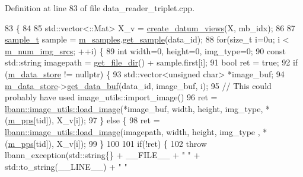Definition at line 83 of file data\+\_\+reader\+\_\+triplet.\+cpp.


\begin{DoxyCode}
83                                                                               \{
84 
85   std::vector<::Mat> X\_v = \hyperlink{classlbann_1_1data__reader__multi__images_a713e4cc80a2d3a2b721d0912e3773baa}{create\_datum\_views}(X, mb\_idx);
86 
87   \hyperlink{classlbann_1_1data__reader__triplet_adddc55e0424d38b60ac5f55c16990bb7}{sample\_t} sample = \hyperlink{classlbann_1_1data__reader__triplet_a1f414c6d80f6e48fc91f98db0531f1f8}{m\_samples}.\hyperlink{classlbann_1_1offline__patches__npz_a9c8ad05ffdf0d44ee1c9b61740dd42e3}{get\_sample}(data\_id);
88   \textcolor{keywordflow}{for}(\textcolor{keywordtype}{size\_t} i=0u; i < \hyperlink{classlbann_1_1data__reader__multi__images_a70752a5442e99333fec52def9eadc58f}{m\_num\_img\_srcs}; ++i) \{
89     \textcolor{keywordtype}{int} width=0, height=0, img\_type=0;
90     \textcolor{keyword}{const} std::string imagepath = \hyperlink{classlbann_1_1generic__data__reader_ab4c6c2d4ba40ece809ce896828c8ff03}{get\_file\_dir}() + sample.first[i];
91     \textcolor{keywordtype}{bool} ret = \textcolor{keyword}{true};
92     \textcolor{keywordflow}{if} (\hyperlink{classlbann_1_1generic__data__reader_aefc076b842933a882214f4f709ca49c9}{m\_data\_store} != \textcolor{keyword}{nullptr}) \{
93       std::vector<unsigned char> *image\_buf;
94       \hyperlink{classlbann_1_1generic__data__reader_aefc076b842933a882214f4f709ca49c9}{m\_data\_store}->\hyperlink{classlbann_1_1generic__data__store_a2abb3d0327b528d36e23fcef9b937798}{get\_data\_buf}(data\_id, image\_buf, i);
95       \textcolor{comment}{// This could probably have used image\_utils::import\_image()}
96       ret = \hyperlink{classlbann_1_1image__utils_ac324a04f877601387cfb10750f1f6b8d}{lbann::image\_utils::load\_image}(*image\_buf, width, height, 
      img\_type, *(\hyperlink{classlbann_1_1imagenet__reader_a1e0d0ed4ac529de3e9f735512f5e3dd8}{m\_pps}[tid]), X\_v[i]);
97     \} \textcolor{keywordflow}{else} \{
98       ret = \hyperlink{classlbann_1_1image__utils_ac324a04f877601387cfb10750f1f6b8d}{lbann::image\_utils::load\_image}(imagepath, width, height, img\_type
      , *(\hyperlink{classlbann_1_1imagenet__reader_a1e0d0ed4ac529de3e9f735512f5e3dd8}{m\_pps}[tid]), X\_v[i]);
99     \}
100   
101     \textcolor{keywordflow}{if}(!ret) \{
102       \textcolor{keywordflow}{throw} lbann\_exception(std::string\{\} + \_\_FILE\_\_ + \textcolor{stringliteral}{" "} + std::to\_string(\_\_LINE\_\_) + \textcolor{stringliteral}{" "}

\end{DoxyCode}
